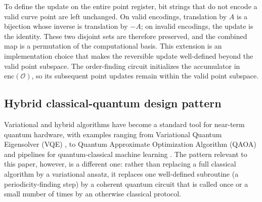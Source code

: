 \begin{revision}
To define the update on the entire point register, bit strings that do not encode a valid curve point are left unchanged. On valid encodings, translation by $A$ is a bijection whose inverse is translation by $-A$; on invalid encodings, the update is the identity. These two disjoint sets are therefore preserved, and the combined map is a permutation of the computational basis. This extension is an implementation choice that makes the reversible update well-defined beyond the valid point subspace. The order-finding circuit initializes the accumulator in $\mathrm{enc}(\mathcal{O})$, so its subsequent point updates remain within the valid point subspace.
\end{revision}

\subsection{Hybrid classical-quantum design pattern}

Variational and hybrid algorithms have become a standard tool for near-term quantum hardware, with examples ranging from Variational Quantum Eigensolver (VQE) \cite{Peruzzo2014, McClean2016}, to Quantum Approximate Optimization Algorithm (QAOA) \cite{Farhi2014} and pipelines for quantum-classical machine learning \cite{Schuld2019, Cerezo2021}. The pattern relevant to this paper, however, is a different one: rather than replacing a full classical algorithm by a variational ansatz, it replaces one well-defined subroutine (a periodicity-finding step) by a coherent quantum circuit that is called once or a small number of times by an otherwise classical protocol.